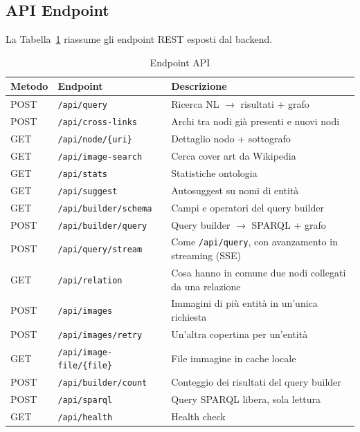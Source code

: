 \subsection{API Endpoint}

La Tabella~\ref{tab:endpoint} riassume gli endpoint REST esposti dal backend.

\begin{table}[h]
\centering
\caption{Endpoint API}
\label{tab:endpoint}
\small
\begin{tabular}{llp{7.2cm}}
\toprule
\textbf{Metodo} & \textbf{Endpoint}             & \textbf{Descrizione}                     \\
\midrule
POST   & \texttt{/api/query}         & Ricerca NL $\rightarrow$ risultati + grafo \\
POST   & \texttt{/api/cross-links}   & Archi tra nodi gi\`a presenti e nuovi nodi \\
GET    & \texttt{/api/node/\{uri\}}  & Dettaglio nodo + sottografo               \\
GET    & \texttt{/api/image-search}  & Cerca cover art da Wikipedia              \\
GET    & \texttt{/api/stats}         & Statistiche ontologia                     \\
GET    & \texttt{/api/suggest}       & Autosuggest su nomi di entit\`a           \\
GET    & \texttt{/api/builder/schema} & Campi e operatori del query builder       \\
POST   & \texttt{/api/builder/query}  & Query builder $\rightarrow$ SPARQL + grafo \\
POST   & \texttt{/api/query/stream}  & Come \texttt{/api/query}, con avanzamento in streaming (SSE) \\
GET    & \texttt{/api/relation}     & Cosa hanno in comune due nodi collegati da una relazione \\
POST   & \texttt{/api/images}       & Immagini di pi\`u entit\`a in un'unica richiesta \\
POST   & \texttt{/api/images/retry} & Un'altra copertina per un'entit\`a   \\
GET    & \texttt{/api/image-file/\{file\}} & File immagine in cache locale        \\
POST   & \texttt{/api/builder/count} & Conteggio dei risultati del query builder \\
POST   & \texttt{/api/sparql}       & Query SPARQL libera, sola lettura          \\
GET    & \texttt{/api/health}        & Health check                              \\
\bottomrule
\end{tabular}
\end{table}
